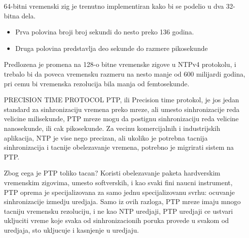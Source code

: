 \documentclass[a4paper,12pt, master]{etf}
\begin{document}
	64-bitni vremenski zig je trenutno implementiran kako bi se podelio u dva 32-bitna dela. 
	\begin{itemize}
		\item Prva polovina broji broj sekundi do nesto preko 136 godina.
		\item Druga polovina predstavlja deo sekunde do razmere pikosekunde
	\end{itemize}

	Predlozena je promena na 128-o bitne vremenske zigove u NTPv4 protokolu, i trebalo bi da 
	poveca vremensku razmeru na nesto manje od 600 milijardi godina, pri cemu bi vremenska 
	rezolucija bila manja od femtosekunde.

	PRECISION TIME PROTOCOL
	PTP, ili Precision time protokol, je jos jedan standard za sinhronizaciju vremena preko 
	mreze, ali umesto sinhronizacije reda velicine milisekunde, PTP mreze mogu da postignu 
	sinhronizaciju reda velicine nanosekunde, ili cak pikosekunde. Za vecinu komercijalnih i 
	industrijskih aplikacija, NTP je vise nego precizan, ali ukoliko je potrebna tacnija 
	sinhronizacija i tacnije obelezavanje vremena, potrebno je migrirati sistem na PTP.

	Zbog cega je PTP toliko tacan? Koristi obelezavanje paketa hardverskim vremenskim 
	zigovima, umesto softverskih, i kao svaki fini naucni instrument, PTP oprema je 
	specijalizovana za samo jednu specijalizovanu svrhu: ocuvanje sinhronizacije izmedju 
	uredjaja. Samo iz ovih razloga, PTP mreze imaju mnogo tacniju vremensku rezoluciju, i ne 
	kao NTP uredjaji, PTP uredjaji ce ustvari ukljuciti vreme koje svaka od sinhronizacionih 
	poruka provede u svakom od uredjaja, sto ukljucuje i kasnjenje u uredjaju.
\end{document}
